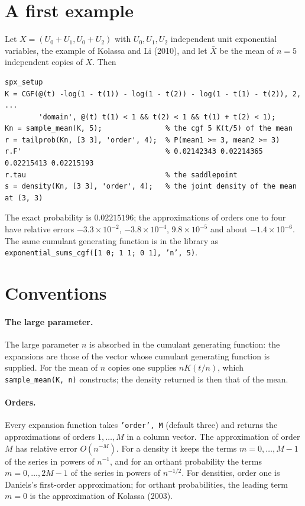 \documentclass[11pt]{article}
\newcommand{\prog}[1]{\texttt{#1}}
\begin{document}
\section{A first example}\label{sec:first}

Let $X=(U_0+U_1,U_0+U_2)$ with $U_0,U_1,U_2$ independent unit exponential variables, the example
of Kolassa and Li (2010), and let $\bar X$ be the mean of $n=5$ independent copies of $X$. Then
\begin{lstlisting}
spx_setup
K = CGF(@(t) -log(1 - t(1)) - log(1 - t(2)) - log(1 - t(1) - t(2)), 2, ...
        'domain', @(t) t(1) < 1 && t(2) < 1 && t(1) + t(2) < 1);
Kn = sample_mean(K, 5);               % the cgf 5 K(t/5) of the mean
r = tailprob(Kn, [3 3], 'order', 4);  % P(mean1 >= 3, mean2 >= 3)
r.F'                                  % 0.02142343 0.02214365 0.02215413 0.02215193
r.tau                                 % the saddlepoint
s = density(Kn, [3 3], 'order', 4);   % the joint density of the mean at (3, 3)
\end{lstlisting}
The exact probability is $0.02215196$; the approximations of orders one to four have relative
errors $-3.3\times10^{-2}$, $-3.8\times10^{-4}$, $9.8\times10^{-5}$ and about $-1.4\times10^{-6}$. The
same cumulant generating function is in the library as
\prog{exponential\_sums\_cgf([1 0; 1 1; 0 1], 'n', 5)}.

\section{Conventions}\label{sec:conv}

\paragraph{The large parameter.} The large parameter $n$ is absorbed in the cumulant generating
function: the expansions are those of the vector whose cumulant generating function is supplied.
For the mean of $n$ copies one supplies $nK(t/n)$, which \prog{sample\_mean(K, n)} constructs; the
density returned is then that of the mean.

\paragraph{Orders.} Every expansion function takes \prog{'order', M} (default three) and returns the
approximations of orders $1,\ldots,M$ in a column vector. The approximation of order $M$ has
relative error $O(n^{-M})$. For a density it keeps the terms $m=0,\ldots,M-1$ of the series in
powers of $n^{-1}$, and for an orthant probability the terms $m=0,\ldots,2M-1$ of the series in
powers of $n^{-1/2}$. For densities, order one is Daniels's first-order approximation; for orthant
probabilities, the leading term $m=0$ is the approximation of Kolassa (2003).
\end{document}
